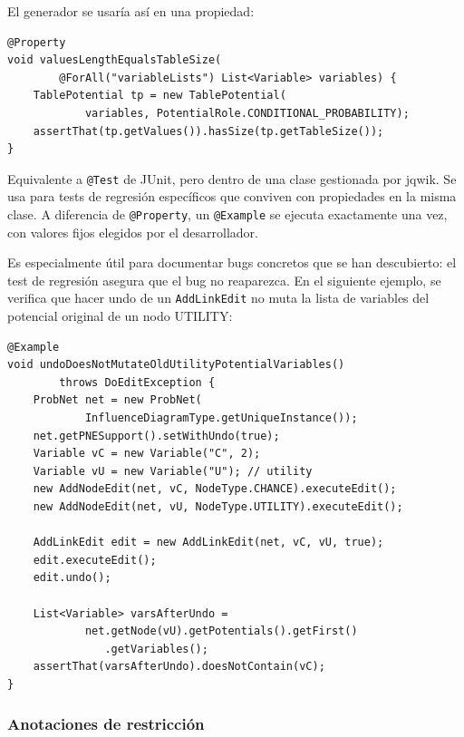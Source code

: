 \documentclass[12pt,a4paper]{article}
\begin{document}
\begin{description}[leftmargin=2em, style=nextline]
    El generador se usaría así en una propiedad:

\begin{lstlisting}[caption={Uso de un generador personalizado en una propiedad}, label={lst:provide-usage}]
@Property
void valuesLengthEqualsTableSize(
        @ForAll("variableLists") List<Variable> variables) {
    TablePotential tp = new TablePotential(
            variables, PotentialRole.CONDITIONAL_PROBABILITY);
    assertThat(tp.getValues()).hasSize(tp.getTableSize());
}
\end{lstlisting}

  \item[\texttt{@Example}]
    Equivalente a \texttt{@Test} de JUnit, pero dentro de una clase
    gestionada por jqwik. Se usa para tests de regresión específicos
    que conviven con propiedades en la misma clase. A diferencia de
    \texttt{@Property}, un \texttt{@Example} se ejecuta exactamente una
    vez, con valores fijos elegidos por el desarrollador.

    Es especialmente útil para documentar bugs concretos que se han
    descubierto: el test de regresión asegura que el bug no reaparezca.
    En el siguiente ejemplo, se verifica que hacer undo de un
    \texttt{AddLinkEdit} no muta la lista de variables del potencial
    original de un nodo UTILITY:

\begin{lstlisting}[caption={\texttt{@Example}: test de regresión específico}, label={lst:example}]
@Example
void undoDoesNotMutateOldUtilityPotentialVariables()
        throws DoEditException {
    ProbNet net = new ProbNet(
            InfluenceDiagramType.getUniqueInstance());
    net.getPNESupport().setWithUndo(true);
    Variable vC = new Variable("C", 2);
    Variable vU = new Variable("U"); // utility
    new AddNodeEdit(net, vC, NodeType.CHANCE).executeEdit();
    new AddNodeEdit(net, vU, NodeType.UTILITY).executeEdit();

    AddLinkEdit edit = new AddLinkEdit(net, vC, vU, true);
    edit.executeEdit();
    edit.undo();

    List<Variable> varsAfterUndo =
            net.getNode(vU).getPotentials().getFirst()
               .getVariables();
    assertThat(varsAfterUndo).doesNotContain(vC);
}
\end{lstlisting}

\end{description}

\subsubsection{Anotaciones de restricción}
\end{document}
